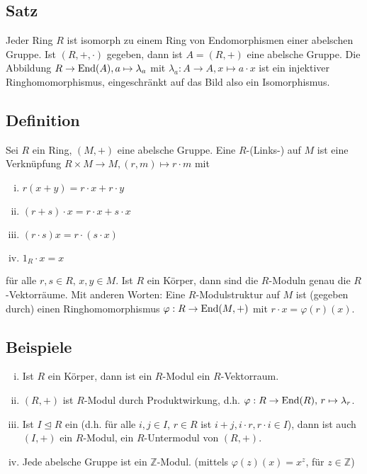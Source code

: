 \subsection[Satz: Jeder Ring ist isomorph zu einem Endomorphismenring]{Satz} %
\label{sub:21}
Jeder Ring $R$ ist isomorph zu einem Ring von Endomorphismen einer abelschen Gruppe.
Ist $(R,+, \cdot )$ gegeben, dann ist $A=(R,+)$ eine abelsche Gruppe. Die Abbildung $R \to \operatorname{End}(A), a \mapsto \lambda_a $ mit 
$\lambda_a : A \to A, x \mapsto a \cdot x$ ist ein injektiver Ringhomomorphismus, eingeschränkt auf das Bild also ein Isomorphismus. \bewende

\subsection[Definition: Modul]{Definition} %
\label{sub:22}
Sei $R$ ein Ring, $(M,+)$ eine abelsche Gruppe. Eine $R$-(Links-) auf $M$ ist eine Verknüpfung $R \times M \to M, (r,m) \mapsto r \cdot m$ mit
\begin{enumerate}[(i)]
	\item $r(x+y)= r \cdot x + r \cdot y$
	\item $(r+s) \cdot x = r \cdot x + s \cdot x$
	\item $(r \cdot s) x = r \cdot (s \cdot x)$
	\item $1_R \cdot x = x$
\end{enumerate}
für alle $r,s \in R, \,x,y \in M$. Ist $R$ ein Körper, dann sind die $R$-Moduln genau die $R$-Vektorräume. Mit anderen Worten: Eine $R$-Modulstruktur auf $M$ ist 
(gegeben durch) einen Ringhomomorphismus $\varphi : R \to \operatorname{End}(M,+)$ mit $r \cdot x = \varphi(r) (x)$.

\subsection[Beispiele für Moduln]{Beispiele} %
\label{sub:23}
\begin{enumerate}[(i)]
	\item Ist $R$ ein Körper, dann ist ein $R$-Modul ein $R$-Vektorraum.
	\item $(R,+)$ ist $R$-Modul durch Produktwirkung, d.h. $\varphi : R \to \operatorname{End}(R),\, r \mapsto \lambda_r$.
	\item Ist $I \unlhd R$ ein  (d.h. für alle $i,j \in I$, $r \in R$ ist $i + j, i \cdot r, r \cdot i \in I$), dann ist auch $(I,+)$ ein
	$R$-Modul, ein $R$-Untermodul von $(R,+)$.
	\item Jede abelsche Gruppe ist ein $\mathds{Z}$-Modul. \hfill {\color{light_gray}(mittels $\varphi(z)(x) = x^z$, für $z \in \mathds{Z}$)}
\end{enumerate}

